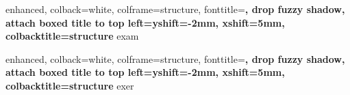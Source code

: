 %
{
	enhanced,
	colback=white,
	colframe=structure,
	fonttitle=\bfseries,
	drop fuzzy shadow,
	attach boxed title to top left={yshift=-2mm, xshift=5mm},
	colbacktitle=structure
	}{exam}%


%
{
	enhanced,
	colback=white,
	colframe=structure,
	fonttitle=\bfseries,
	drop fuzzy shadow,
	attach boxed title to top left={yshift=-2mm, xshift=5mm},
	colbacktitle=structure
	}{exer}



\newcommand{\mini}[2][0.8]{
	\begin{minipage}[c]{#1\columnwidth}
		#2
	\end{minipage}
}
\newcommand{\minit}[2][0.8]{
	\begin{minipage}[t]{#1\columnwidth}
		#2
	\end{minipage}
}

\newcommand{\cmini}[2][0.8]{
	\begin{center}
		\begin{minipage}{#1\columnwidth}
			\raggedright
			#2
		\end{minipage}
	\end{center}
}



\newcommand{\fig}[2][1]{%
	\texttt{[image: \#2]}
}

\newcommand{\cbox}[2][1]{%
	\setlength\fboxsep{5mm}
	\setlength\fboxrule{.2 mm}
	\begin{center}
		\fcolorbox{black}{white}{
			\vspace{-0.5cm}
			\begin{minipage}{#1\columnwidth}
				\raggedright
				#2
			\end{minipage}
		}
	\end{center}
	\setlength\fboxsep{0cm}
}





